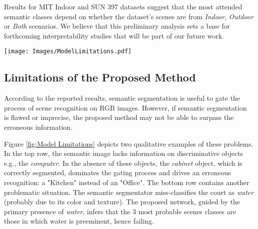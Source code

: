 \documentclass[review, 3p, sort&compress]{elsarticle}
\begin{document}
Results for MIT Indoor and SUN 397 datasets suggest that the most attended semantic classes depend on whether the dataset's scenes are from \textit{Indoor}, \textit{Outdoor} or \textit{Both} scenarios. We believe that this preliminary analysis sets a base for forthcoming interpretability studies that will be part of our future work.

\begin{figure*}[t!]
    \centering
    \texttt{[image: Images/ModelLimitations.pdf]}
    \caption{Examples of limitations of the proposed method. In some cases, when semantic segmentation is insufficient (top row) or incorrect (bottom row) network predictions are erroneous. In the top row, the presence of a cabinet and the absence of the computer in the semantic segmentation leads to a kitchen prediction. In the bottom row, the erroneous segmentation of the floor as water leads to water-related scene predictions.}
    \label{fig:Model Limitations}
\end{figure*}


\subsection{Limitations of the Proposed Method}
According to the reported results, semantic segmentation is useful to gate the process of scene recognition on RGB images. However, if semantic segmentation is flawed or imprecise, the proposed method may not be able to surpass the erroneous information.

Figure \ref{fig:Model Limitations} depicts two qualitative examples of these problems. In the top row, the semantic image lacks information on discriminative objects e.g., the \textit{computer}. In the absence of these objects, the \textit{cabinet} object, which is correctly segmented, dominates the gating process and drives an erroneous recognition: a "Kitchen" instead of an "Office". The bottom row contains another problematic situation. The semantic segmentator miss-classifies the court as \textit{water} (probably due to its color and texture). The proposed network, guided by the primary presence of \textit{water}, infers that the 3 most probable scenes classes are those in which water is preeminent, hence failing.
\end{document}
